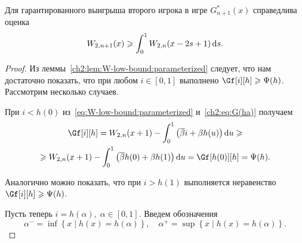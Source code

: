 {\begin{theorem}\label{ch2:thm:W-bound}
  Для гарантированного выигрыша второго игрока в игре $G_{n+1}^*(x)$ справедлива оценка
  \begin{equation*}
    W_{2,n+1}(x) \geqslant \int_0^1 W_{2,n}(x - 2s + 1) \mathop{}\!\mathrm{d} s.
  \end{equation*}
\end{theorem}
\begin{proof}
  Из леммы~\ref{ch2:lem:W-low-bound:parameterized} следует, что нам достаточно показать, что при любом $i \in [0, 1]$ выполнено $\Gf[i][h] \geqslant \Psi(h)$.
  Рассмотрим несколько случаев.

  При $i < h(0)$ из~\eqref{eq:W-low-bound:parameterized} и~\eqref{ch2:eq:G(ha)} получаем
  \begin{multline*}
    \Gf[i][h] =
    W_{2,n}(x + 1) - \int_0^1 \left( \DCo i + \Co h(u) \right) \di u \geqslant \\
    \geqslant W_{2,n}(x + 1) - \int_0^1 \left( \DCo h(0) + \Co h(1) \right) \di
    u = \Gf[h(0)][h] = \Psi(h).
  \end{multline*}

  Аналогично можно показать, что при $i > h(1)$ выполняется неравенство $\Gf[i][h] \geqslant \Psi(h)$.

  Пусть теперь $i = h(\alpha), \; \alpha \in [0, 1]$. Введем обозначения
  \[
    \alpha^- = \inf \left\{ x \;|\; h(x) = h(\alpha) \right\}, \quad \alpha^+ =
    \sup \left\{ x \;|\; h(x) = h(\alpha) \right\}.
  \]
  

\end{proof}}
